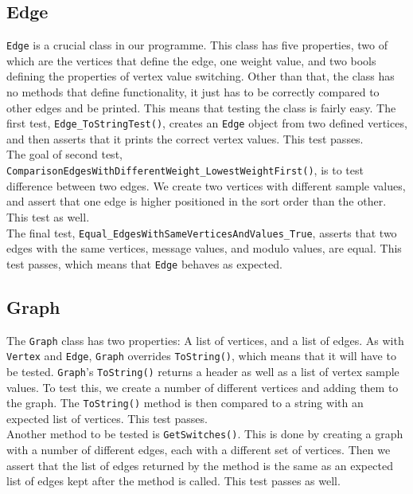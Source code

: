 \subsection{Edge}
\lstinline|Edge| is a crucial class in our programme.
This class has five properties, two of which are the vertices that define the edge, one weight value, and two bools defining the properties of vertex value switching.
Other than that, the class has no methods that define functionality, it just has to be correctly compared to other edges and be printed.
This means that testing the class is fairly easy.
The first test, \lstinline|Edge_ToStringTest()|, creates an \lstinline|Edge| object from two defined vertices, and then asserts that it prints the correct vertex values.
This test passes.\\
The goal of second test, \lstinline|ComparisonEdgesWithDifferentWeight_LowestWeightFirst()|, is to test difference between two edges.
We create two vertices with different sample values, and assert that one edge is higher positioned in the sort order than the other.
This test as well.\\
The final test, \lstinline|Equal_EdgesWithSameVerticesAndValues_True|, asserts that two edges with the same vertices, message values, and modulo values, are equal.
This test passes, which means that \lstinline|Edge| behaves as expected.

\subsection{Graph}
The \lstinline|Graph| class has two properties: A list of vertices, and a list of edges.
As with \lstinline|Vertex| and \lstinline|Edge|, \lstinline|Graph| overrides \lstinline|ToString()|, which means that it will have to be tested.
\lstinline|Graph|'s \lstinline|ToString()| returns a header as well as a list of vertex sample values.
To test this, we create a number of different vertices and adding them to the graph.
The \lstinline|ToString()| method is then compared to a string with an expected list of vertices.
This test passes.\\
Another method to be tested is \lstinline|GetSwitches()|.
This is done by creating a graph with a number of different edges, each with a different set of vertices.
Then we assert that the list of edges returned by the method is the same as an expected list of edges kept after the method is called.
This test passes as well.

